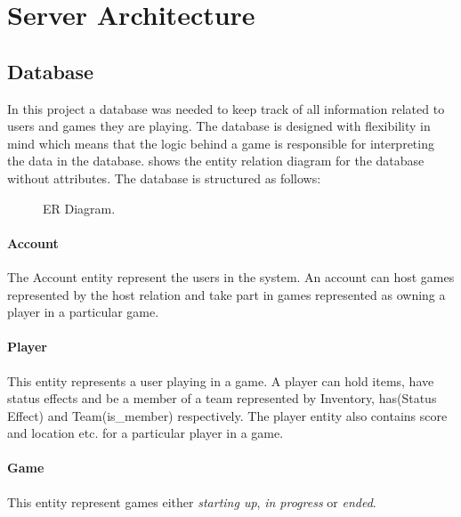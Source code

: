 \section{Server Architecture}





\subsection{Database}
In this project a database was needed to keep track of all information related to users and games they are playing. The database is designed with flexibility in mind which means that the logic behind a game is responsible for interpreting the data in the database.  shows the entity relation diagram for the database without attributes. The database is structured as follows:

\begin{figure}
  \centering
    
  \caption{ER Diagram.}
  \label{fig:ER}
\end{figure}




\paragraph{Account}
The Account entity represent the users in the system. An account can host games represented by the host relation and take part in games represented as owning a player in a particular game.

\paragraph{Player}
This entity represents a user playing in a game. A player can hold items, have status effects and be a member of a team represented by Inventory, has(Status Effect) and Team(is\_member) respectively. The player entity also contains score and location etc. for a particular player in a game.

\paragraph{Game}
This entity represent games either \textit{starting up}, \textit{in progress} or \textit{ended}.

